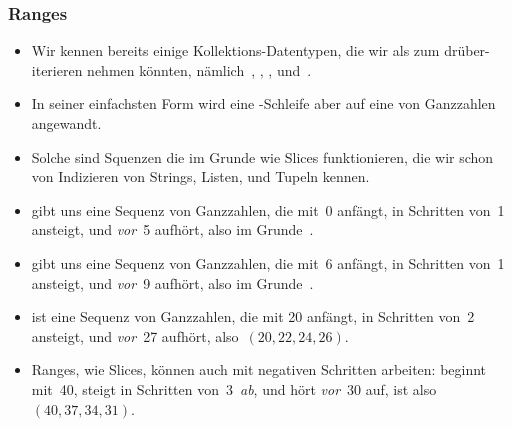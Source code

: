 \documentclass[aspectratio=169,mathserif,notheorems]{beamer}%
\begin{document}
\begin{frame}%
\frametitle{Ranges}%
\begin{itemize}%
\item Wir kennen bereits einige Kollektions-Datentypen, die wir als  zum drüber-iterieren nehmen könnten, nämlich~, , , und~.%
%
\item<2-> In seiner einfachsten Form wird eine -Schleife aber auf eine  von Ganzzahlen angewandt\cite{PSF:P3D:TPT:MCFT}.%
%
\item<3-> Solche  sind Squenzen die im Grunde wie Slices funktionieren, die wir schon von Indizieren von Strings, Listen, und Tupeln kennen.%
%
\item<4->  gibt uns eine Sequenz von Ganzzahlen, die mit~0 anfängt, in Schritten von~1 ansteigt, und \emph{vor}~5 aufhört, also im Grunde~.%
%
\item<5->  gibt uns eine Sequenz von Ganzzahlen, die mit~6 anfängt, in Schritten von~1 ansteigt, und \emph{vor}~9 aufhört, also im Grunde~.%
%
\item<6->  ist eine Sequenz von Ganzzahlen, die mit 20 anfängt, in Schritten von~2 ansteigt, und \emph{vor}~27 aufhört, also~$(20, 22, 24, 26)$.%
%
\item<7-> Ranges, wie Slices, können auch mit negativen Schritten arbeiten:  beginnt mit~40, steigt in Schritten von~3~\emph{ab}, und hört \emph{vor}~30 auf, ist also~$(40, 37, 34, 31)$.%
\end{itemize}%
\end{frame}%
%
%
\end{document}

